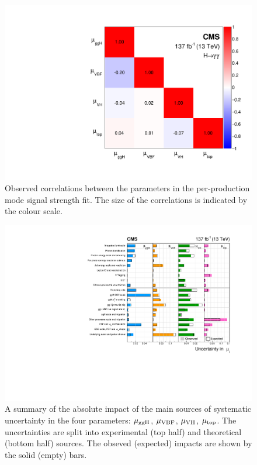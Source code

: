 \begin{figure}[htbp]
  \centering
  \includegraphics[width=.5\textwidth]{Figures/hgg_results/mu_correlations.pdf}
  \caption[Correlations between per-production mode signal strengths]
  {
    Observed correlations between the parameters in the per-production mode signal strength fit. The size of the correlations is indicated by the colour scale.
  }
  \label{fig:corr_mu}
\end{figure}

\begin{figure}[htbp]
  \centering
  \includegraphics[width=1\textwidth]{Figures/hgg_results/mu_systematics.pdf}
  \caption[Impact of systematic uncertainty sources on the per-production mode signal strengths]
  {
    A summary of the absolute impact of the main sources of systematic uncertainty in the four parameters: $\mu_{\rm{ggH}}$, $\mu_{\rm{VBF}}$, $\mu_{\rm{VH}}$, $\mu_{\rm{top}}$. The uncertainties are split into experimental (top half) and theoretical (bottom half) sources. The obseved (expected) impacts are shown by the solid (empty) bars.
  }
  \label{fig:syst_mu}
\end{figure}


\newpage
